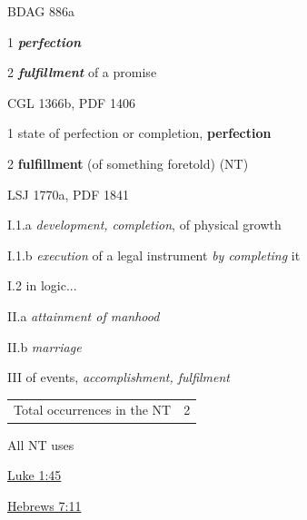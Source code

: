 				\begin{compactdesc}
					\item[BDAG 886a] \textbf{}
						\begin{compactitem}
							\item[1] \textbf{\textit{perfection}}
							\item[2] \textbf{\textit{fulfillment}} of a promise
						\end{compactitem}
					\item[CGL 1366b, PDF 1406] \textbf{}
						\begin{compactitem}
							\item[1] state of perfection or completion, \textbf{perfection}
							\item[2] \textbf{fulfillment} (of something foretold) (NT)
						\end{compactitem}
					\item[LSJ 1770a, PDF 1841] \textbf{}
						\begin{compactitem}
							\item[I.1.a] \textit{development, completion}, of physical growth
							\item[I.1.b] \textit{execution} of a legal instrument \textit{by completing} it
							\item[I.2] in logic...
							\item[II.a] \textit{attainment of manhood}
							\item[II.b] \textit{marriage}
							\item[III] of events, \textit{accomplishment, fulfilment}
						\end{compactitem}
				\end{compactdesc}
				
				\begin{tabular}{ll}
					Total occurrences in the NT & 2
				\end{tabular}
				
				\begin{compactdesc}
					\item[All NT uses] \textbf{}
						\begin{compactdesc}
							\item[{\hyperref[LUKE-1-45]{Luke 1:45}}]
							\item[{\hyperref[HEBREWS-7-11]{Hebrews 7:11}}]
						\end{compactdesc}
				\end{compactdesc}
				
			\subparagraph{\texorpdfstring{}{}}
				\label{TELEIOTES-2}
			
